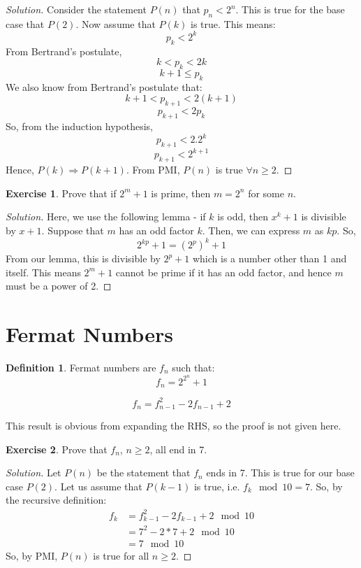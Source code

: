 \documentclass[12pt,letterpaper]{amsbook}
\theoremstyle{definition}
\newtheorem{definition}{Definition} %
\newtheorem*{exercise}{Exercise}
\newenvironment{solution}
  {\renewcommand\qedsymbol{$\blacksquare$}\begin{proof}[Solution]}
  {\end{proof}}
\begin{document}
\begin{solution}
  Consider the statement $P(n)$ that $p_n < 2^n$. This is true for the base case that $P(2)$. Now assume that $P(k)$ is true. This means:
  \[p_k < 2^k\]
  From Bertrand's postulate,
  \[k < p_k < 2k\]
  \[k+1 \leq p_k \]
  We also know from Bertrand's postulate that:
  \[k+1 < p_{k+1} < 2(k+1)\]
  \[p_{k+1} < 2p_k\]
  So, from the induction hypothesis,
  \[p_{k+1} < 2.2^k\]
  \[p_{k+1} < 2^{k+1}\]
  Hence, $P(k) \Rightarrow P(k+1)$. From PMI, $P(n)$ is true $\forall n \geq 2$.
\end{solution}
\begin{exercise}
  Prove that if $2^{m}+1$ is prime, then $m = 2^n$ for some $n$.
\end{exercise}
\begin{solution}
  Here, we use the following lemma - if $k$ is odd, then $x^k+1$ is divisible by $x+1$.
  Suppose that $m$ has an odd factor $k$. Then, we can express $m$ as $kp$. So,
  \[2^{kp}+1 = (2^{p})^k + 1\]
  From our lemma, this is divisible by $2^p+1$ which is a number other than 1 and itself. This means $2^m+1$ cannot be prime if it has an odd factor, and hence $m$ must be a power of 2.
\end{solution}

\section{Fermat Numbers}

\begin{definition}
  Fermat numbers are $f_n$ such that:
  \[f_n = 2^{2^n}+1\]
\end{definition}

\begin{lemma}
  \[f_n = f_{n-1}^2 - 2f_{n-1} + 2\]  
\end{lemma}

This result is obvious from expanding the RHS, so the proof is not given here.

\begin{exercise}
  Prove that $f_n$, $n \geq 2$, all end in 7.
\end{exercise}
\begin{solution}
  Let $P(n)$ be the statement that $f_n$ ends in 7. This is true for our base case $P(2)$. Let us assume that $P(k-1)$ is true, i.e. $f_k \mod 10 = 7$. So, by the recursive definition:
  \begin{align*}
    f_k &= f_{k-1}^2 - 2f_{k-1} + 2 \mod 10 \\
        &= 7^2 - 2* 7 + 2 \mod 10 \\ 
        &= 7 \mod 10
  \end{align*}
  So, by PMI, $P(n)$ is true for all $n \geq 2$.
\end{solution}
\end{document}
